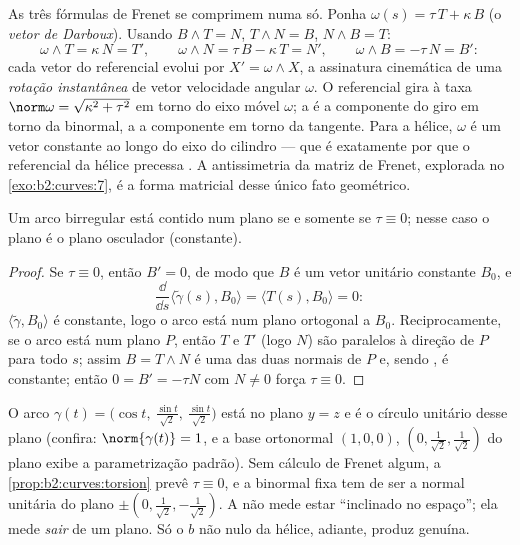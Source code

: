 \begin{example}\label{ex:b2:curves:darboux}
As três fórmulas de Frenet se comprimem numa só. Ponha $\omega(s) =
\tau\,T + \kappa\,B$ (o \emph{vetor de Darboux}). Usando $B
\wedge T = N$, $T \wedge N = B$, $N \wedge B = T$:
\[
\omega \wedge T = \kappa\,N = T', \qquad
\omega \wedge N = \tau\,B - \kappa\,T = N', \qquad
\omega \wedge B = -\tau\,N = B' :
\]
cada vetor do referencial evolui por $X' = \omega \wedge X$, a
assinatura cinemática de uma \emph{rotação instantânea} de
vetor velocidade angular $\omega$. O referencial gira à taxa
$\norm\omega = \sqrt{\kappa^2 + \tau^2}$ em torno do eixo
móvel $\omega$; a  é a componente do giro em torno da
binormal, a  a componente em torno da tangente. Para
a hélice, $\omega$ é um vetor constante ao longo do eixo do cilindro
--- que é exatamente por que o referencial da hélice precessa
. A antissimetria da matriz de Frenet, explorada no
\cref{exo:b2:curves:7}, é a forma matricial desse único
fato geométrico.
\end{example}

\begin{proposition}\label{prop:b2:curves:torsion}
Um arco birregular está contido num plano se e somente se $\tau
\equiv 0$; nesse caso o plano é o plano osculador (constante).
\end{proposition}

\begin{proof}
Se $\tau \equiv 0$, então $B' = 0$, de modo que $B$ é um vetor unitário
constante $B_0$, e
\[
\frac{\dd}{\dd s}\langle \tilde\gamma(s), B_0\rangle
= \langle T(s), B_0\rangle = 0 :
\]
$\langle \tilde\gamma, B_0\rangle$ é constante, logo o arco está num plano
ortogonal a $B_0$. Reciprocamente, se o arco está num plano $P$,
então $T$ e $T'$ (logo $N$) são paralelos à direção de
$P$ para todo $s$; assim $B = T \wedge N$ é uma das duas normais
 de $P$ e, sendo , é constante; então $0 = B'
= -\tau N$ com $N \neq 0$ força $\tau \equiv 0$.
\end{proof}

\begin{example}
O arco $\gamma(t) = \bigl(\cos t,\ \tfrac{\sin t}{\sqrt2},\
\tfrac{\sin t}{\sqrt2}\bigr)$ está no plano $y = z$ e
é o círculo unitário desse plano (confira: $\norm{\gamma(t)} =
1$, e a base ortonormal $(1,0,0)$,
$(0, \tfrac1{\sqrt2}, \tfrac1{\sqrt2})$ do plano exibe a parametrização
padrão). Sem cálculo de Frenet algum, a
\cref{prop:b2:curves:torsion} prevê $\tau \equiv 0$, e
a binormal fixa tem de ser a normal unitária do plano $\pm(0,
\tfrac1{\sqrt2}, -\tfrac1{\sqrt2})$. A  não mede
estar ``inclinado no espaço''; ela mede \emph{sair} de um
plano. Só o $b$ não nulo da hélice, adiante, produz
 genuína.
\end{example}

